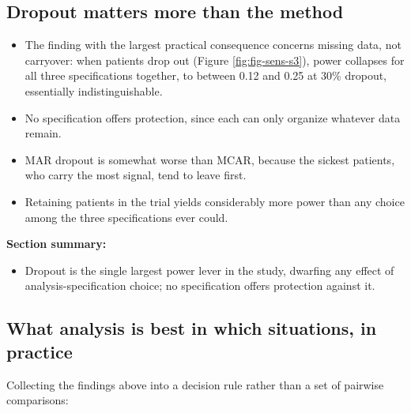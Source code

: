 \documentclass[
  11pt,
]{article}
\providecommand{\tightlist}{%
  \setlength{\itemsep}{0pt}\setlength{\parskip}{0pt}}
\begin{document}
\subsection{Dropout matters more than the method}\label{dropout-matters-more-than-the-method}

\begin{itemize}
\tightlist
\item
  The finding with the largest practical consequence concerns missing
  data, not carryover: when patients drop out (Figure
  \ref{fig:fig-sens-s3}), power collapses for all three
  specifications together, to between 0.12 and 0.25 at 30\% dropout,
  essentially indistinguishable.
\item
  No specification offers protection, since each can only organize
  whatever data remain.
\item
  MAR dropout is somewhat worse than MCAR, because the sickest
  patients, who carry the most signal, tend to leave first.
\item
  Retaining patients in the trial yields considerably more power than
  any choice among the three specifications ever could.
\end{itemize}

\textbf{Section summary:}

\begin{itemize}
\tightlist
\item
  Dropout is the single largest power lever in the study, dwarfing
  any effect of analysis-specification choice; no specification
  offers protection against it.
\end{itemize}

\subsection{What analysis is best in which situations, in practice}\label{what-analysis-is-best-in-which-situations-in-practice}

Collecting the findings above into a decision rule rather than a set
of pairwise comparisons:
\end{document}
